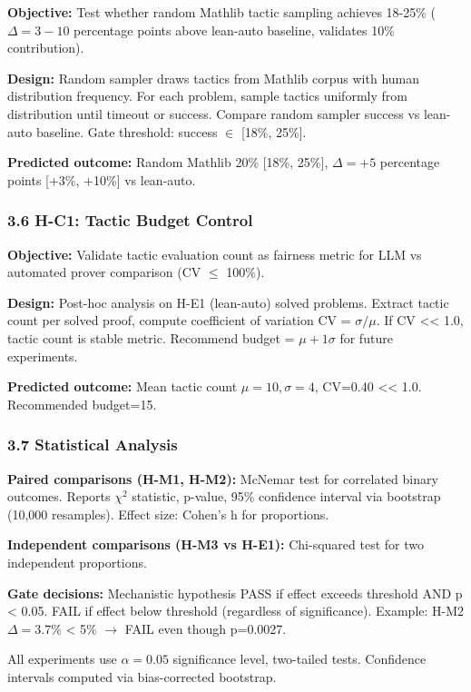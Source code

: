 \textbf{Objective:} Test whether random Mathlib tactic sampling achieves 18-25\% ($\Delta =3-10$ percentage points above lean-auto baseline, validates 10\% contribution).

\textbf{Design:} Random sampler draws tactics from Mathlib corpus with human distribution frequency. For each problem, sample tactics uniformly from distribution until timeout or success. Compare random sampler success vs lean-auto baseline. Gate threshold: success $\in$ [18\%, 25\%].

\textbf{Predicted outcome:} Random Mathlib 20\% [18\%, 25\%], $\Delta =+5$ percentage points [+3\%, +10\%] vs lean-auto.

\subsubsection{3.6 H-C1: Tactic Budget Control}

\textbf{Objective:} Validate tactic evaluation count as fairness metric for LLM vs automated prover comparison (CV $\leq$ 100\%).

\textbf{Design:} Post-hoc analysis on H-E1 (lean-auto) solved problems. Extract tactic count per solved proof, compute coefficient of variation CV = $\sigma / \mu$. If CV << 1.0, tactic count is stable metric. Recommend budget = $\mu + 1\sigma$ for future experiments.

\textbf{Predicted outcome:} Mean tactic count $\mu =10, \sigma =4$, CV=0.40 << 1.0. Recommended budget=15.

\subsubsection{3.7 Statistical Analysis}

\textbf{Paired comparisons (H-M1, H-M2):} McNemar test for correlated binary outcomes. Reports $\chi^2$ statistic, p-value, 95\% confidence interval via bootstrap (10,000 resamples). Effect size: Cohen's h for proportions.

\textbf{Independent comparisons (H-M3 vs H-E1):} Chi-squared test for two independent proportions.

\textbf{Gate decisions:} Mechanistic hypothesis PASS if effect exceeds threshold AND p < 0.05. FAIL if effect below threshold (regardless of significance). Example: H-M2 $\Delta =3.7$\% < 5\% $\rightarrow$ FAIL even though p=0.0027.

All experiments use $\alpha =0.05$ significance level, two-tailed tests. Confidence intervals computed via bias-corrected bootstrap.
